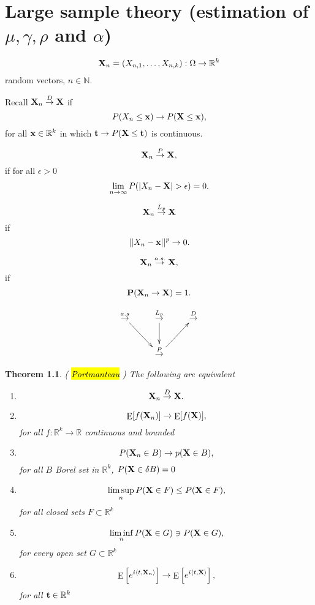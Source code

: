 \documentclass[12pt,a4paper, notitlepage]{book}
\newcommand{\hlc}[2][yellow]{ {\sethlcolor{#1} \hl{#2}} }
\theoremstyle{definition} %
\theoremstyle{plain} %
\newtheorem{theorem}{Theorem}
\newcommand{\R}{\mathbb R}
\newcommand{\N}{\mathbb N}
\DeclareMathOperator{\E}{E}
\newcommand{\Important}[1]{ {\it \hlc{#1} } }
\begin{document}
\chapter{Large sample theory (estimation of $\mu, \gamma, \rho$ and $ \alpha$)}



\[ {\bf X} _n = (X_{n, 1}, \dots, X_{n,k}) : \Omega \rightarrow \R^k \]
 random vectors, $n \in \N . $

Recall ${\bf X}_n \overset{D}{\rightarrow}  {\bf X}$ if 
\[ P(X_n \leq {\bf x}) \rightarrow P({\bf X} \leq {\bf x}) , \]
 for all ${\bf x} \in \R^k$ in which ${\bf t} \rightarrow P({\bf X} \leq {\bf t})$ is continuous. 

\[ {\bf X}_n \overset{P}{\rightarrow}  {\bf X} , \]
 if for all $\epsilon > 0$ 
\[  \lim_{n \rightarrow \infty} P(|X_n - {\bf X}| > \epsilon) = 0. \]
 
\[ {\bf X}_n \overset{L_p}{\rightarrow} {\bf X} \]
if 
\[ ||X_n - {\bf x}||^p \rightarrow 0 . \]

\[ {\bf X}_n  \overset{a.s.}{\rightarrow} {\bf X} , \]
 if 
\[ {\bf P}({\bf X}_n \rightarrow {\bf X}) = 1 . \]

\begin{displaymath}
 \xymatrix{
  \overset{a.s}{\to} \ar[dr]   & \overset{ L_p}{\to} \ar[d] & \overset{D}{\to}  \\
 & \overset{P}{\to} \ar[ur]  &  }
\end{displaymath}


\begin{theorem} (\Important{Portmanteau})
The following are equivalent
\begin{enumerate}
\item \[ {\bf X}_n \overset{D}{\rightarrow} {\bf X} .\] 
\item \[  \E[ f({\bf X}_n)] \rightarrow \E[f({\bf X})]  , \] for all $f: \R^k \rightarrow \R$ continuous and bounded 
\item \[ P({\bf X}_n \in B) \rightarrow p({\bf X} \in B) , \] for all $B$ Borel set in $\R^k$, $P({\bf X} \in \delta B) = 0$
\item \[ \limsup_n{P({\bf X} \in F)} \leq P({\bf X} \in F) , \] for all closed sets $F \subset \R^k$
\item \[ \liminf_n{P({\bf X} \in G)} \ni P({\bf X} \in G) , \] for every open set $G \subset \R^k$
\item \[ \E \left[ e^{i \langle t, {\bf X}_n \rangle} \right]  \rightarrow \E \left[e^{i\langle t, {\bf X} \rangle} \right] , \] for all ${\bf t} \in \R^k$
\end{enumerate}
\end{theorem}
\end{document}
